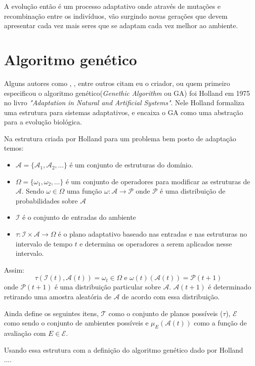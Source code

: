 A evolução então é um processo adaptativo onde através de mutações e recombinação entre os indivíduos, vão surgindo novas gerações que devem apresentar cada vez mais seres que se adaptam cada vez melhor ao ambiente.

\section{Algoritmo genético}

Alguns autores como \citeauthor{Mitchell1996}, \citeauthor{LeeJacobson2015}, \citeauthor{Kwong2001} entre outros citam eu o criador, ou quem primeiro especificou o algoritmo genético(\textit{Genethic Algorithm} ou GA) foi Holland em 1975 no livro \textit{"Adaptation in Natural and Artificial Systems"}. Nele Holland formaliza uma estrutura para sistemas adaptativos, e encaixa o GA como uma abstração para a evolução biológica.

Na estrutura criada por Holland para um problema bem posto de adaptação temos:
\begin{itemize}
	\item \( \mathscr{A} = \{ \mathcal{A}_1, \mathcal{A}_2, \ldots \} \) é um conjunto de estruturas do domínio.
	\item \( \Omega = \{ \omega_1, \omega_2, \ldots \} \) é um conjunto de operadores para modificar as estruturas de \( \mathscr{A} \).  Sendo \( \omega \in \Omega \) uma função \(\omega : \mathscr{A} \to \mathcal{P} \) onde \(\mathcal{P}\) é uma distribuição de probabilidades sobre \(\mathscr{A}\)
	\item \( \mathcal{I}\) é o conjunto de entradas do ambiente
	\item \( \tau : \mathcal{I} \times \mathscr{A} \to \Omega\) é o plano adaptativo baseado nas entradas e nas estruturas no intervalo de tempo \(t\) e determina os operadores a serem aplicados nesse intervalo.
\end{itemize}
Assim: 
\[\tau(\mathcal{I}(t), \mathscr{A}(t)) = \omega_t \in \Omega \text{ e } \omega(t)(\mathscr{A}(t)) = \mathcal{P}(t + 1)\]
onde \(\mathcal{P}(t + 1) \) é uma distribuição particular sobre \( \mathscr{A} \). \( \mathscr{A}(t+1) \) é determinado retirando uma amostra aleatória de \( \mathscr{A} \) de acordo com essa distribuição. \cite{Holland1992}

Ainda define os seguintes itens, \( \mathcal{T} \) como o conjunto de planos possíveis (\(\tau\)), \(\mathcal{E}\) como sendo o conjunto de ambientes possíveis e \(\mu_E(\mathscr{A}(t))\) como a função de avaliação com \( E \in \mathcal{E} \). 

Usando essa estrutura com a definição do algoritmo genético dado por Holland ....

